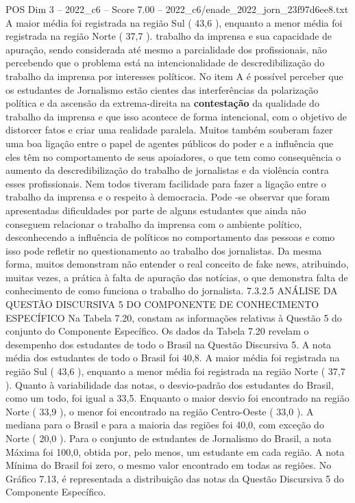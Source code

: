 \begin{textsample}{POS Dim 3 – 2022\_c6 – Score 7.00 – 2022\_c6/enade\_2022\_jorn\_23f97d6ee8.txt}
A maior média foi registrada na região Sul ( 43,6 ), enquanto a menor média foi registrada na região Norte ( 37,7 ). trabalho da imprensa e sua capacidade de apuração, sendo considerada até mesmo a parcialidade dos profissionais, não percebendo que o problema está na intencionalidade de descredibilização do trabalho da imprensa por interesses políticos.
No item A é possível perceber que os estudantes de Jornalismo estão cientes das interferências da polarização política e da ascensão da extrema-direita na \textbf{contestação} da qualidade do trabalho da imprensa e que isso acontece de forma intencional, com o objetivo de distorcer fatos e criar uma realidade paralela.
Muitos também souberam fazer uma boa ligação entre o papel de agentes públicos do poder e a influência que eles têm no comportamento de seus apoiadores, o que tem como consequência o aumento da descredibilização do trabalho de jornalistas e da violência contra esses profissionais.
Nem todos tiveram facilidade para fazer a ligação entre o trabalho da imprensa e o respeito à democracia.
Pode -se observar que foram apresentadas dificuldades por parte de alguns estudantes que ainda não conseguem relacionar o trabalho da imprensa com o ambiente político, desconhecendo a influência de políticos no comportamento das pessoas e como isso pode refletir no questionamento ao trabalho dos jornalistas.
Da mesma forma, muitos demonstram não entender o real conceito de fake news, atribuindo, muitas vezes, a prática à falta de apuração das notícias, o que demonstra falta de conhecimento de como funciona o trabalho do jornalista. 7.3.2.5 ANÁLISE DA QUESTÃO DISCURSIVA 5 DO COMPONENTE DE CONHECIMENTO ESPECÍFICO Na Tabela 7.20, constam as informações relativas à Questão 5 do conjunto do Componente Específico.
Os dados da Tabela 7.20 revelam o desempenho dos estudantes de todo o Brasil na Questão Discursiva 5.
A nota média dos estudantes de todo o Brasil foi 40,8.
A maior média foi registrada na região Sul ( 43,6 ), enquanto a menor média foi registrada na região Norte ( 37,7 ).
Quanto à variabilidade das notas, o desvio-padrão dos estudantes do Brasil, como um todo, foi igual a 33,5.
Enquanto o maior desvio foi encontrado na região Norte ( 33,9 ), o menor foi encontrado na região Centro-Oeste ( 33,0 ).
A mediana para o Brasil e para a maioria das regiões foi 40,0, com exceção do Norte ( 20,0 ).
Para o conjunto de estudantes de Jornalismo do Brasil, a nota Máxima foi 100,0, obtida por, pelo menos, um estudante em cada região.
A nota Mínima do Brasil foi zero, o mesmo valor encontrado em todas as regiões.
No Gráfico 7.13, é representada a distribuição das notas da Questão Discursiva 5 do Componente Específico.

\end{textsample}
